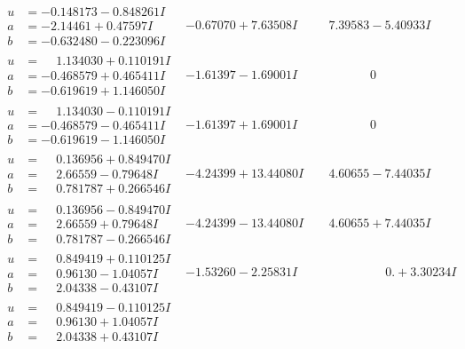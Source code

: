 \documentclass[1p]{elsarticle_modified}
\theoremstyle{definition}
\begin{document}
$$\begin{array}{c|c|c}
\begin{aligned}
u &= -0.148173 - 0.848261 I \\
a &= -2.14461 + 0.47597 I \\
b &= -0.632480 - 0.223096 I\end{aligned}
 & -0.67070 + 7.63508 I & \phantom{-}7.39583 - 5.40933 I \\ \hline\begin{aligned}
u &= \phantom{-}1.134030 + 0.110191 I \\
a &= -0.468579 + 0.465411 I \\
b &= -0.619619 + 1.146050 I\end{aligned}
 & -1.61397 - 1.69001 I & \phantom{-0.000000 } 0 \\ \hline\begin{aligned}
u &= \phantom{-}1.134030 - 0.110191 I \\
a &= -0.468579 - 0.465411 I \\
b &= -0.619619 - 1.146050 I\end{aligned}
 & -1.61397 + 1.69001 I & \phantom{-0.000000 } 0 \\ \hline\begin{aligned}
u &= \phantom{-}0.136956 + 0.849470 I \\
a &= \phantom{-}2.66559 - 0.79648 I \\
b &= \phantom{-}0.781787 + 0.266546 I\end{aligned}
 & -4.24399 + 13.44080 I & \phantom{-}4.60655 - 7.44035 I \\ \hline\begin{aligned}
u &= \phantom{-}0.136956 - 0.849470 I \\
a &= \phantom{-}2.66559 + 0.79648 I \\
b &= \phantom{-}0.781787 - 0.266546 I\end{aligned}
 & -4.24399 - 13.44080 I & \phantom{-}4.60655 + 7.44035 I \\ \hline\begin{aligned}
u &= \phantom{-}0.849419 + 0.110125 I \\
a &= \phantom{-}0.96130 - 1.04057 I \\
b &= \phantom{-}2.04338 - 0.43107 I\end{aligned}
 & -1.53260 - 2.25831 I & \phantom{-0.000000 -}0. + 3.30234 I \\ \hline\begin{aligned}
u &= \phantom{-}0.849419 - 0.110125 I \\
a &= \phantom{-}0.96130 + 1.04057 I \\
b &= \phantom{-}2.04338 + 0.43107 I\end{aligned}

\end{array}$$
\end{document}
